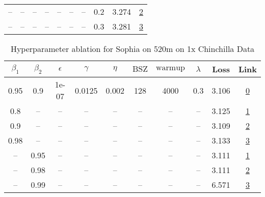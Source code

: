 \begin{table}[H]
\begin{tabular}{cccccccccc}
-- & -- & -- & -- & -- & -- & -- & 0.2 & 3.274 & \href{https://wandb.ai/stanford-mercury/optimizer-scaling/runs/sweep-300m-6B-sophiaf66c842lr0.004-wd0.2-minlr0-warmup4000-b10.9-cd3965}{2} \\
-- & -- & -- & -- & -- & -- & -- & 0.3 & 3.281 & \href{https://wandb.ai/stanford-mercury/optimizer-scaling/runs/sweep-300m-6B-sophiabcf6b6lr0.004-wd0.3-minlr0-warmup4000-b10.9--8f044b}{3} \\
\bottomrule
\end{tabular}
\end{table}

\begin{table}[H]
\centering
\caption{Hyperparameter ablation for Sophia on 520m on 1x Chinchilla Data}
\label{tab:ablation_sophia_520m_on_1x_chinchilla_data}
\begin{tabular}{cccccccccc}
\toprule
$\beta_1$ & $\beta_2$ & $\epsilon$ & $\gamma$ & $\eta$ & $\mathrm{BSZ}$ & $\mathrm{warmup}$ & $\lambda$ & Loss & Link \\
\midrule
0.95 & 0.9 & 1e-07 & 0.0125 & 0.002 & 128 & 4000 & 0.3 & 3.106 & \href{https://wandb.ai/stanford-mercury/optimizer-scaling/runs/sweep-520m-10B-sophia651c9blr0.002-wd0.3-minlr0-warmup4000-b10.9-46bf7a}{0} \\
\midrule
0.8 & -- & -- & -- & -- & -- & -- & -- & 3.125 & \href{https://wandb.ai/stanford-mercury/optimizer-scaling/runs/sweep-520m-10B-sophiaded744lr0.002-wd0.3-minlr0-warmup4000-b10.8-48fa58}{1} \\
0.9 & -- & -- & -- & -- & -- & -- & -- & 3.109 & \href{https://wandb.ai/stanford-mercury/optimizer-scaling/runs/sweep-520m-10B-sophiaed133clr0.002-wd0.3-minlr0-warmup4000-b10.9-5c6e5d}{2} \\
0.98 & -- & -- & -- & -- & -- & -- & -- & 3.133 & \href{https://wandb.ai/stanford-mercury/optimizer-scaling/runs/sweep-520m-10B-sophia573a3clr0.002-wd0.3-minlr0-warmup4000-b10.9-b85ec2}{3} \\
-- & 0.95 & -- & -- & -- & -- & -- & -- & 3.111 & \href{https://wandb.ai/stanford-mercury/optimizer-scaling/runs/sweep-520m-10B-sophiad6af81lr0.002-wd0.3-minlr0-warmup4000-b10.9-529318}{1} \\
-- & 0.98 & -- & -- & -- & -- & -- & -- & 3.111 & \href{https://wandb.ai/stanford-mercury/optimizer-scaling/runs/sweep-520m-10B-sophia216d9elr0.002-wd0.3-minlr0-warmup4000-b10.9-9d3974}{2} \\
-- & 0.99 & -- & -- & -- & -- & -- & -- & 6.571 & \href{https://wandb.ai/stanford-mercury/optimizer-scaling/runs/sweep-520m-10B-sophia96c899lr0.002-wd0.3-minlr0-warmup4000-b10.9-44bd90}{3} \\

\end{tabular}
\end{table}
